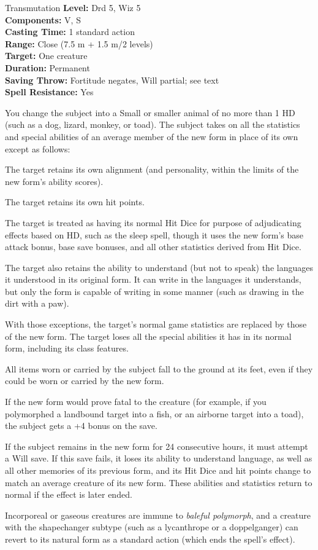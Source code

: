 {Transmutation}
{
	\textbf{Level:}
	Drd 5, Wiz 5\\
	\textbf{Components:}
	V, S\\
	\textbf{Casting Time:}
	1 standard action\\
	\textbf{Range:}
	Close (7.5 m + 1.5 m/2 levels)\\
	\textbf{Target:}
	One creature\\
	\textbf{Duration:}
	Permanent\\
	\textbf{Saving Throw:}
	Fortitude negates, Will partial; see text\\
	\textbf{Spell Resistance:}
	Yes\\
}
{
	You change the subject into a Small or smaller animal of no more than 1 HD (such as a dog, lizard, monkey, or toad). The subject takes on all the statistics and special abilities of an average member of the new form in place of its own except as follows:

\begin{itemize*}
\item The target retains its own alignment (and personality, within the limits of the new form's ability scores).
\item The target retains its own hit points.
\item The target is treated as having its normal Hit Dice for purpose of adjudicating effects based on HD, such as the sleep spell, though it uses the new form's base attack bonus, base save bonuses, and all other statistics derived from Hit Dice.
\item The target also retains the ability to understand (but not to speak) the languages it understood in its original form. It can write in the languages it understands, but only the form is capable of writing in some manner (such as drawing in the dirt with a paw).
\end{itemize*}

	With those exceptions, the target's normal game statistics are replaced by those of the new form. The target loses all the special abilities it has in its normal form, including its class features.

	All items worn or carried by the subject fall to the ground at its feet, even if they could be worn or carried by the new form.

	If the new form would prove fatal to the creature (for example, if you polymorphed a landbound target into a fish, or an airborne target into a toad), the subject gets a +4 bonus on the save.

	If the subject remains in the new form for 24 consecutive hours, it must attempt a Will save. If this save fails, it loses its ability to understand language, as well as all other memories of its previous form, and its Hit Dice and hit points change to match an average creature of its new form. These abilities and statistics return to normal if the effect is later ended.

	Incorporeal or gaseous creatures are immune to \emph{baleful polymorph}, and a creature with the shapechanger subtype (such as a lycanthrope or a doppelganger) can revert to its natural form as a standard action (which ends the spell's effect).

}
